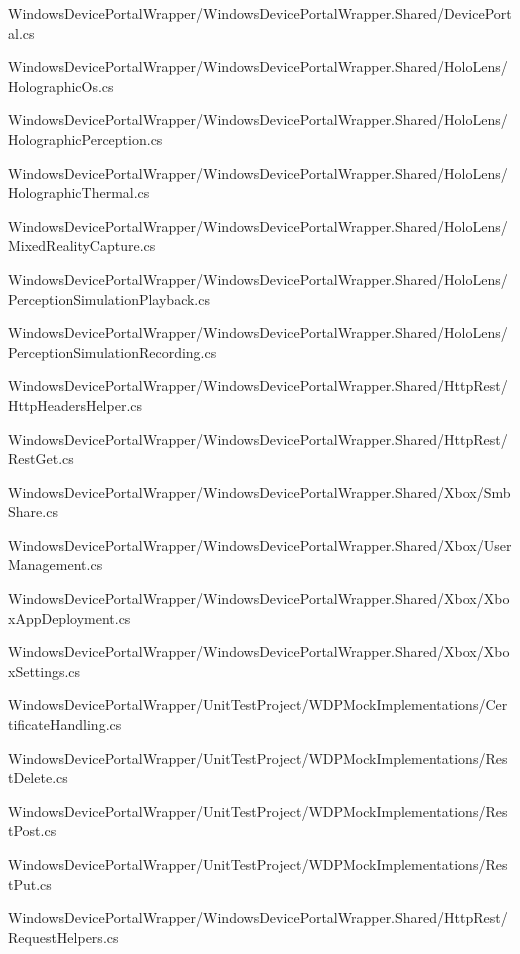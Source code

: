 \begin{DoxyCompactItemize}
Windows\+Device\+Portal\+Wrapper/\+Windows\+Device\+Portal\+Wrapper.\+Shared/Device\+Portal.\+cs\item 
Windows\+Device\+Portal\+Wrapper/\+Windows\+Device\+Portal\+Wrapper.\+Shared/\+Holo\+Lens/Holographic\+Os.\+cs\item 
Windows\+Device\+Portal\+Wrapper/\+Windows\+Device\+Portal\+Wrapper.\+Shared/\+Holo\+Lens/Holographic\+Perception.\+cs\item 
Windows\+Device\+Portal\+Wrapper/\+Windows\+Device\+Portal\+Wrapper.\+Shared/\+Holo\+Lens/Holographic\+Thermal.\+cs\item 
Windows\+Device\+Portal\+Wrapper/\+Windows\+Device\+Portal\+Wrapper.\+Shared/\+Holo\+Lens/Mixed\+Reality\+Capture.\+cs\item 
Windows\+Device\+Portal\+Wrapper/\+Windows\+Device\+Portal\+Wrapper.\+Shared/\+Holo\+Lens/Perception\+Simulation\+Playback.\+cs\item 
Windows\+Device\+Portal\+Wrapper/\+Windows\+Device\+Portal\+Wrapper.\+Shared/\+Holo\+Lens/Perception\+Simulation\+Recording.\+cs\item 
Windows\+Device\+Portal\+Wrapper/\+Windows\+Device\+Portal\+Wrapper.\+Shared/\+Http\+Rest/Http\+Headers\+Helper.\+cs\item 
Windows\+Device\+Portal\+Wrapper/\+Windows\+Device\+Portal\+Wrapper.\+Shared/\+Http\+Rest/Rest\+Get.\+cs\item 
Windows\+Device\+Portal\+Wrapper/\+Windows\+Device\+Portal\+Wrapper.\+Shared/\+Xbox/Smb\+Share.\+cs\item 
Windows\+Device\+Portal\+Wrapper/\+Windows\+Device\+Portal\+Wrapper.\+Shared/\+Xbox/User\+Management.\+cs\item 
Windows\+Device\+Portal\+Wrapper/\+Windows\+Device\+Portal\+Wrapper.\+Shared/\+Xbox/Xbox\+App\+Deployment.\+cs\item 
Windows\+Device\+Portal\+Wrapper/\+Windows\+Device\+Portal\+Wrapper.\+Shared/\+Xbox/Xbox\+Settings.\+cs\item 
Windows\+Device\+Portal\+Wrapper/\+Unit\+Test\+Project/\+W\+D\+P\+Mock\+Implementations/Certificate\+Handling.\+cs\item 
Windows\+Device\+Portal\+Wrapper/\+Unit\+Test\+Project/\+W\+D\+P\+Mock\+Implementations/Rest\+Delete.\+cs\item 
Windows\+Device\+Portal\+Wrapper/\+Unit\+Test\+Project/\+W\+D\+P\+Mock\+Implementations/Rest\+Post.\+cs\item 
Windows\+Device\+Portal\+Wrapper/\+Unit\+Test\+Project/\+W\+D\+P\+Mock\+Implementations/Rest\+Put.\+cs\item 
Windows\+Device\+Portal\+Wrapper/\+Windows\+Device\+Portal\+Wrapper.\+Shared/\+Http\+Rest/Request\+Helpers.\+cs\end{DoxyCompactItemize}
